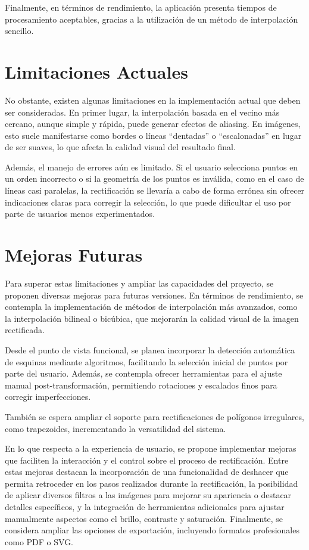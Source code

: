 Finalmente, en términos de rendimiento, la aplicación presenta tiempos de procesamiento aceptables, gracias a la utilización de un método de interpolación sencillo.

\section{Limitaciones Actuales}

No obstante, existen algunas limitaciones en la implementación actual que deben ser consideradas. En primer lugar, la interpolación basada en el vecino más cercano, aunque simple y rápida, puede generar efectos de aliasing. En imágenes, esto suele manifestarse como bordes o líneas “dentadas” o “escalonadas” en lugar de ser suaves, lo que afecta la calidad visual del resultado final.

Además, el manejo de errores aún es limitado. Si el usuario selecciona puntos en un orden incorrecto o si la geometría de los puntos es inválida, como en el caso de líneas casi paralelas, la rectificación se llevaría a cabo de forma errónea sin ofrecer indicaciones claras para corregir la selección, lo que puede dificultar el uso por parte de usuarios menos experimentados.


\section{Mejoras Futuras}

Para superar estas limitaciones y ampliar las capacidades del proyecto, se proponen diversas mejoras para futuras versiones. En términos de rendimiento, se contempla la implementación de métodos de interpolación más avanzados, como la interpolación bilineal o bicúbica, que mejorarán la calidad visual de la imagen rectificada.

Desde el punto de vista funcional, se planea incorporar la detección automática de esquinas mediante algoritmos, facilitando la selección inicial de puntos por parte del usuario. Además, se contempla ofrecer herramientas para el ajuste manual post-transformación, permitiendo rotaciones y escalados finos para corregir imperfecciones.

También se espera ampliar el soporte para rectificaciones de polígonos irregulares, como trapezoides, incrementando la versatilidad del sistema.

En lo que respecta a la experiencia de usuario, se propone implementar mejoras que faciliten la interacción y el control sobre el proceso de rectificación. Entre estas mejoras destacan la incorporación de una funcionalidad de deshacer que permita retroceder en los pasos realizados durante la rectificación, la posibilidad de aplicar diversos filtros a las imágenes para mejorar su apariencia o destacar detalles específicos, y la integración de herramientas adicionales para ajustar manualmente aspectos como el brillo, contraste y saturación. Finalmente, se considera ampliar las opciones de exportación, incluyendo formatos profesionales como PDF o SVG.

